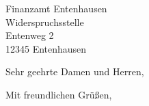 \documentclass[12pt,ngerman,parskip=half,%
fromalign=center,fromrule=aftername]{scrlttr2}
\begin{document}
\begin{letter}{Finanzamt Entenhausen \\ Widerspruchsstelle \\ Entenweg 2 \\ 12345 Entenhausen}

\opening{Sehr geehrte Damen und Herren,}

\blindtext

\blindtext

\blindtext

\closing{Mit freundlichen Grüßen,}
\end{letter}
\end{document}
